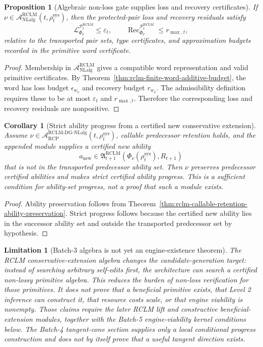 \documentclass[11pt,a4paper]{article}
\newtheorem{proposition}[theorem]{Proposition}
\newtheorem{corollary}[theorem]{Corollary}
\newtheorem{limitation}[theorem]{Limitation}
\newcommand{\Lcal}{\mathcal L}
\newcommand{\Pcal}{\mathcal P}
\newcommand{\Acal}{\mathcal A}
\newcommand{\eps}{\varepsilon}
\newcommand{\RCP}{\mathrm{RCP}}
\newcommand{\RCLM}{\mathrm{RCLM}}
\newcommand{\DG}{\mathrm{DG}}
\newcommand{\sys}{\mathrm{sys}}
\newcommand{\Rec}{\operatorname{Rec}}
\newcommand{\NLalg}{\mathrm{NLalg}}
\begin{document}
\begin{proposition}[Algebraic non-loss gate supplies loss and recovery certificates]
\label{prop:rclm-algebraic-subgate-supplies-loss-recovery}
If \(\nu\in\Acal_{\NLalg}^{\RCLM}(t,\rho_t^{\sys})\), then the protected-pair loss and recovery residuals satisfy
\[
\Lcal^{\Pcal_t^{\RCLM}}_{\Phi_\nu}\le\eps_t,
\qquad
\Rec_{\Phi_\nu}^{\Pcal_t^{\RCLM}}\le r_{\max,t},
\]
relative to the transported pair sets, type certificates, and approximation budgets recorded in the primitive word certificate.
\end{proposition}

\begin{proof}
Membership in \(\Acal_{\NLalg}^{\RCLM}\) gives a compatible word representation and valid primitive certificates.  By Theorem~\ref{thm:rclm-finite-word-additive-budget}, the word has loss budget \(\epsilon_{w_\nu}\) and recovery budget \(r_{w_\nu}\).  The admissibility definition requires these to be at most \(\eps_t\) and \(r_{\max,t}\).  Therefore the corresponding loss and recovery residuals are nonpositive.
\end{proof}

\begin{corollary}[Strict ability progress from a certified new conservative extension]
\label{cor:rclm-strict-ability-progress-extension}
Assume \(\nu\in\Acal_{\RCP}^{\RCLM\text{-}\DG\text{-}\NLalg}(t,\rho_t^{\sys})\), callable predecessor retention holds, and the appended module supplies a certified new ability
\[
a_{\mathrm{new}}\in\mathfrak A_{t+1}^{\RCLM}(\Phi_\nu(\rho_t^{\sys}),R_{t+1})
\]
that is not in the transported predecessor ability set.  Then \(\nu\) preserves predecessor certified abilities and makes strict certified ability progress.  This is a sufficient condition for ability-set progress, not a proof that such a module exists.
\end{corollary}

\begin{proof}
Ability preservation follows from Theorem~\ref{thm:rclm-callable-retention-ability-preservation}.  Strict progress follows because the certified new ability lies in the successor ability set and outside the transported predecessor set by hypothesis.
\end{proof}

\begin{limitation}[Batch-3 algebra is not yet an engine-existence theorem]
\label{lim:rclm-batch3-not-engine-existence}
The RCLM conservative-extension algebra changes the candidate-generation target: instead of searching arbitrary self-edits first, the architecture can search a certified non-lossy primitive algebra.  This reduces the burden of non-loss verification for those primitives.  It does not prove that a beneficial primitive exists, that Level 2 inference can construct it, that resource costs scale, or that engine viability is nonempty.  Those claims require the later RCLM lift and constructive beneficial-extension modules, together with the Batch-5 engine-viability kernel conditions below.  The Batch-4 tangent-cone section supplies only a local conditional progress construction and does not by itself prove that a useful tangent direction exists.
\end{limitation}
\end{document}
